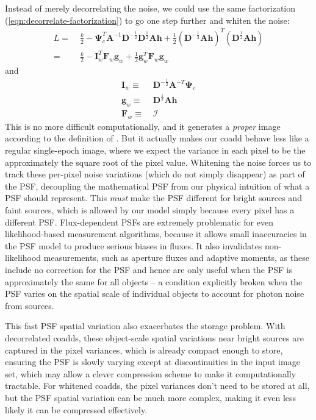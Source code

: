 \documentclass[10pt]{article}
\newcommand{\eqnref}[1]{(\ref{eqn:#1})}
\begin{document}
Instead of merely decorrelating the noise, we could use the same factorization \eqnref{decorrelate-factorization} to go one step further and whiten the noise:
\begin{align}
L
=\;& \frac{k}{2} - \bm{\Psi}_c^T\!\bm{A}^{-1}\bm{D}^{-\frac{1}{2}}
    \!\bm{D}^{\frac{1}{2}}\!\bm{A}\bm{h}
    + \frac{1}{2}\left(\bm{D}^{-\frac{1}{2}}\!\bm{A}\bm{h}\right)^T\!
    \!\left(\bm{D}^{\frac{1}{2}}\!\bm{A}\bm{h}\right)
    \\
=\;& \frac{k}{2} - \bm{I}_w^T\!\bm{F}_w\bm{g}_w
    + \frac{1}{2}\bm{g}_w^T\!\bm{F}_w\bm{g}_w
\label{eqn:likelihood-whitened}
\end{align}
and
\begin{align}
\bm{I}_w \equiv\;& \bm{D}^{-\frac{1}{2}}\bm{A}^{-T}\bm{\Psi}_c \\
\bm{g}_w \equiv\;& \bm{D}^{\frac{1}{2}}\bm{A}\bm{h} \\
\bm{F}_w \equiv\;& \bm{\mathcal{I}}
\end{align}
This is no more difficult computationally, and it generates a \emph{proper} image according to the definition of \cite{2015arXiv151206879Z}.  But it actually makes our coadd behave less like a regular single-epoch image, where we expect the variance in each pixel to be the approximately the square root of the pixel value.  Whitening the noise forces us to track these per-pixel noise variations (which do not simply disappear) as part of the PSF, decoupling the mathematical PSF from our physical intuition of what a PSF should represent.  This \emph{must} make the PSF different for bright sources and faint sources, which is allowed by our model simply because every pixel has a different PSF.  Flux-dependent PSFs are extremely problematic for even likelihood-based measurement algorithms, because it allows small inaccuracies in the PSF model to produce serious biases in fluxes.  It also invalidates non-likelihood measurements, such as aperture fluxes and adaptive moments, as these include no correction for the PSF and hence are only useful when the PSF is approximately the same for all objects -- a condition explicitly broken when the PSF varies on the spatial scale of individual objects to account for photon noise from sources.

This fast PSF spatial variation also exacerbates the storage problem.  With decorrelated coadds, these object-scale spatial variations near bright sources are captured in the pixel variances, which is already compact enough to store, ensuring the PSF is slowly varying except at discontinuities in the input image set, which may allow a clever compression scheme to make it computationally tractable.  For whitened coadds, the pixel variances don't need to be stored at all, but the PSF spatial variation can be much more complex, making it even less likely it can be compressed effectively.
\end{document}
